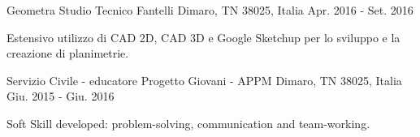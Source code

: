 \begin{cventries}
  \cventry
    {Geometra} %
    {Studio Tecnico Fantelli} %
    {Dimaro, TN 38025, Italia} %
    {Apr. 2016 - Set. 2016} %
    {
      \begin{cvitems} %
        \item {Estensivo utilizzo di CAD 2D, CAD 3D e Google Sketchup per lo sviluppo e la creazione di planimetrie.}
      \end{cvitems}
    }

  \cventry
    {Servizio Civile - educatore} %
    {Progetto Giovani - APPM} %
    {Dimaro, TN 38025, Italia} %
    {Giu. 2015 - Giu. 2016} %
    {
      \begin{cvitems} %
        \item {Soft Skill developed: problem-solving, communication and team-working.}
      \end{cvitems}
    }

\end{cventries}
